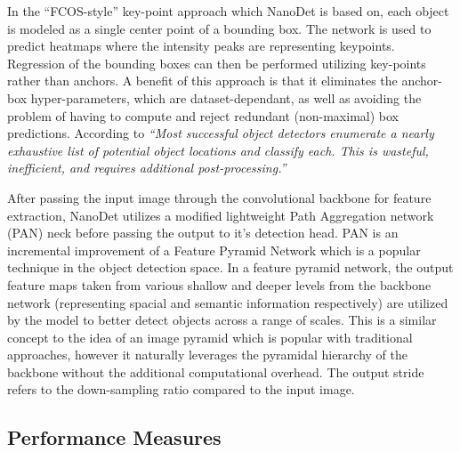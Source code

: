 \documentclass[a4paper,twoside,12pt]{report}
\begin{document}
In the ``FCOS-style'' key-point approach which NanoDet is based on, each object is modeled as a single center point of a bounding box. The network is used to predict heatmaps where the intensity peaks are representing keypoints. Regression of the bounding boxes can then be performed utilizing key-points rather than anchors. A benefit of this approach is that it eliminates the anchor-box hyper-parameters, which are dataset-dependant, as well as avoiding the problem of having to compute and reject redundant (non-maximal) box predictions. According to \cite{cnet} \textit{``Most successful object detectors enumerate a nearly exhaustive list of potential object locations and classify each. This is wasteful, inefficient, and requires additional post-processing.''}   

After passing the input image through the convolutional backbone for feature extraction, NanoDet utilizes a modified lightweight Path Aggregation network (PAN) \citep{pan} neck before passing the output to it's detection head. PAN is an incremental improvement of a Feature Pyramid Network \citep{fpn} which is a popular technique in the object detection space. In a feature pyramid network, the output feature maps taken from various shallow and deeper levels from the backbone network (representing spacial and semantic information respectively) are utilized by the model to better detect objects across a range of scales. This is a similar concept to the idea of an image pyramid which is popular with traditional approaches, however it naturally leverages the pyramidal hierarchy of the backbone without the additional computational overhead. The output stride refers to the down-sampling ratio compared to the input image. 

\subsection{Performance Measures}
\end{document}
